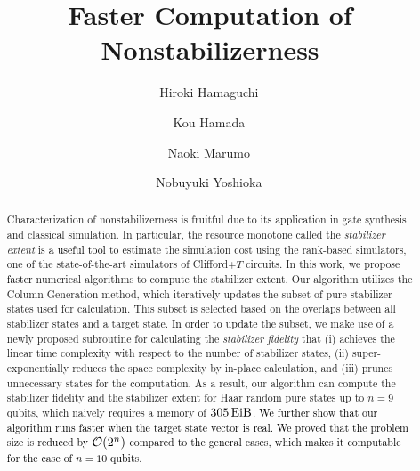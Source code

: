 \documentclass[aps,prx,onecolumn,superscriptaddress,nobibnotes,nofootinbib]{revtex4-2}
\newcommand{\black}[1]{\textcolor{black}{#1}}
\begin{document}
\title{Faster Computation of Nonstabilizerness}

\author{Hiroki Hamaguchi\,}

\author{Kou Hamada\,}

\author{Naoki Marumo\,}

\author{Nobuyuki Yoshioka\,}


\begin{abstract}
  Characterization of nonstabilizerness is fruitful due to its application in gate synthesis and classical simulation.
  In particular, the resource monotone called the \textit{stabilizer extent} is \black{a useful tool} to estimate the simulation cost using the rank-based simulators, one of the state-of-the-art simulators of Clifford+$T$ circuits.
  In this work, we propose \black{faster} numerical algorithms to compute the stabilizer extent.
  Our algorithm utilizes the Column Generation method, which iteratively updates the subset of pure stabilizer states used for calculation.
  This subset is selected based on the overlaps between all stabilizer states and a target state.
  \black{In order to update} the subset, we make use of a newly proposed subroutine for calculating the \textit{stabilizer fidelity} that (i) achieves the linear time complexity with respect to the number of stabilizer states, (ii) super-exponentially reduces the space complexity by in-place calculation, and (iii) prunes unnecessary states for the computation.
  As a result, our algorithm can compute the stabilizer fidelity and the stabilizer extent for Haar random pure states up to $n=9$ qubits, which naively requires a memory of $\SI{305}{\exbi\byte}$.
  \black{We further show that our algorithm runs faster when the target state vector is real. We proved that the problem size is reduced by $\order{2^n}$ compared to the general cases, which makes it computable for the case of $n=10$ qubits.}
\end{abstract}
\maketitle
\end{document}

